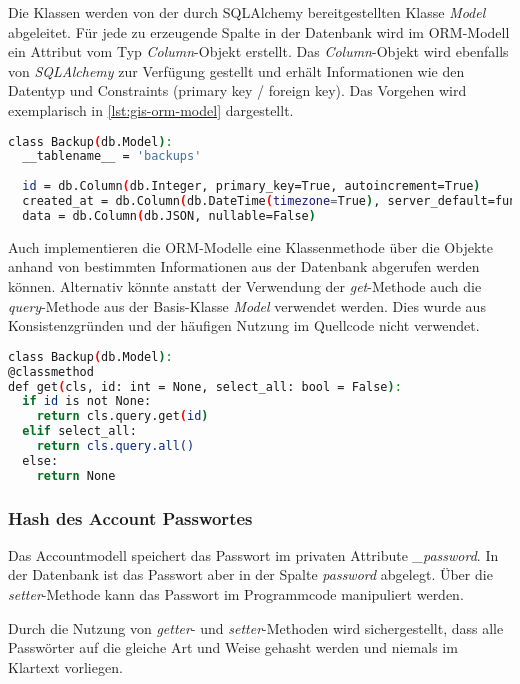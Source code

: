 Die Klassen werden von der durch SQLAlchemy bereitgestellten Klasse \textit{Model} abgeleitet. Für jede zu erzeugende Spalte in der Datenbank wird im ORM-Modell ein Attribut vom Typ \textit{Column}-Objekt erstellt. Das \textit{Column}-Objekt wird ebenfalls von \textit{SQLAlchemy} zur Verfügung gestellt und erhält Informationen wie den Datentyp und Constraints (primary key / foreign key).
Das Vorgehen wird exemplarisch in \autoref{lst:gis-orm-model} dargestellt.

\begin{lstlisting}[language=bash, frame=single, caption={GIS Beispiel eines ORM Models}, captionpos=b, label={lst:gis-orm-model}]
class Backup(db.Model):
  __tablename__ = 'backups'
  
  id = db.Column(db.Integer, primary_key=True, autoincrement=True)
  created_at = db.Column(db.DateTime(timezone=True), server_default=func.now(), nullable=False)
  data = db.Column(db.JSON, nullable=False)
\end{lstlisting}

Auch implementieren die ORM-Modelle eine Klassenmethode über die Objekte anhand von bestimmten Informationen aus der Datenbank abgerufen werden können. Alternativ könnte anstatt der Verwendung der \textit{get}-Methode auch die \textit{query}-Methode aus der Basis-Klasse \textit{Model} verwendet werden. Dies wurde aus Konsistenzgründen und der häufigen Nutzung im Quellcode nicht verwendet.

\begin{lstlisting}[language=bash, frame=single, caption={GIS Beispiel einer Get-Methode des ORM Models}, captionpos=b, label={lst:gis-orm-model-get}]
class Backup(db.Model):
@classmethod
def get(cls, id: int = None, select_all: bool = False):
  if id is not None:
    return cls.query.get(id)
  elif select_all:
    return cls.query.all()
  else:
    return None
\end{lstlisting}

\subsubsection{Hash des Account Passwortes}
Das Accountmodell speichert das Passwort im privaten Attribute \textit{\_password}. In der Datenbank ist das Passwort aber in der Spalte \textit{password} abgelegt. Über die \textit{setter}-Methode kann das Passwort im Programmcode manipuliert werden.

Durch die Nutzung von \textit{getter}- und \textit{setter}-Methoden wird sichergestellt, dass alle Passwörter auf die gleiche Art und Weise gehasht werden und niemals im Klartext vorliegen.


